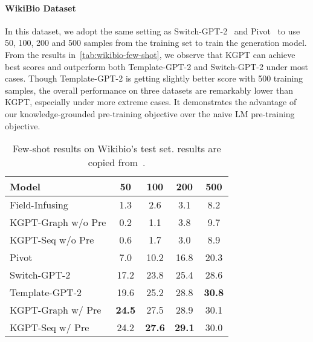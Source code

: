 \documentclass[11pt,a4paper]{article}
\newcommand{\model}{KGPT\xspace}
\begin{document}
\paragraph{WikiBio Dataset}
In this dataset, we adopt the same setting as Switch-GPT-2~\cite{chen2019few} and Pivot~\cite{ma2019key} to use 50, 100, 200 and 500 samples from the training set to train the generation model. From the results in~\autoref{tab:wikibio-few-shot}, we observe that \model can achieve best scores and outperform both Template-GPT-2 and Switch-GPT-2 under most cases. Though Template-GPT-2 is getting slightly better score with 500 training samples, the overall performance on three datasets are remarkably lower than \model, especially under more extreme cases. It demonstrates the advantage of our knowledge-grounded pre-training objective over the naive LM pre-training objective. 
\begin{table}[!thb]
\centering
\small
\begin{tabular}{lcccc}
\hline
Model & 50 & 100 & 200 & 500 \\
\hline
Field-Infusing   &  1.3  & 2.6     &  3.1  &  8.2 \\
\model-Graph w/o Pre  & 0.2  & 1.1  & 3.8  & 9.7 \\
\model-Seq w/o Pre   & 0.6  & 1.7  & 3.0  & 8.9 \\
\hline
Pivot   &    7.0  &   10.2   &   16.8   &    20.3    \\
Switch-GPT-2  &  17.2 &  23.8    &   25.4       &     28.6  \\
Template-GPT-2  & 19.6   & 25.2 & 28.8 & \textbf{30.8} \\
\hline
\model-Graph w/ Pre & \textbf{24.5}  & 27.5  &  28.9  & 30.1  \\
\model-Seq w/ Pre   & 24.2  &  \textbf{27.6}  &  \textbf{29.1} &  30.0 \\
\hline
\end{tabular}
\caption{Few-shot results on Wikibio's test set.  results are copied from~\citet{chen2019few}. }
\label{tab:wikibio-few-shot}
\vspace{-2ex}
\end{table}
\end{document}

